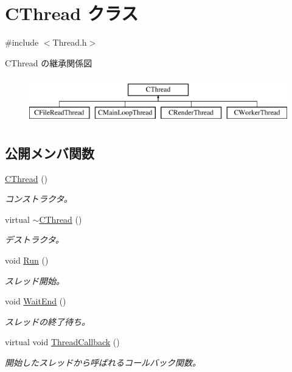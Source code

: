 \hypertarget{class_c_thread}{}\section{C\+Thread クラス}
\label{class_c_thread}


{\ttfamily \#include $<$Thread.\+h$>$}

C\+Thread の継承関係図\begin{figure}[H]
\begin{center}
\leavevmode
\includegraphics[height=2.000000cm]{class_c_thread}
\end{center}
\end{figure}
\subsection*{公開メンバ関数}
\begin{DoxyCompactItemize}
\item 
\hyperlink{class_c_thread_ad256868eded3b90abee1b5f656bb678e}{C\+Thread} ()
\begin{DoxyCompactList}\small\item\em コンストラクタ。 \end{DoxyCompactList}\item 
virtual \hyperlink{class_c_thread_a85a583b2edf56a6448e71e3a9ad301d2}{$\sim$\+C\+Thread} ()
\begin{DoxyCompactList}\small\item\em デストラクタ。 \end{DoxyCompactList}\item 
void \hyperlink{class_c_thread_afa189114d2d65ea7e39679d1ecc6466d}{Run} ()
\begin{DoxyCompactList}\small\item\em スレッド開始。 \end{DoxyCompactList}\item 
void \hyperlink{class_c_thread_a149db91da8c8672ef841a9136c8fae43}{Wait\+End} ()
\begin{DoxyCompactList}\small\item\em スレッドの終了待ち。 \end{DoxyCompactList}\item 
virtual void \hyperlink{class_c_thread_a15c60ba6d652d92c150fda5e10ebb23e}{Thread\+Callback} ()
\begin{DoxyCompactList}\small\item\em 開始したスレッドから呼ばれるコールバック関数。 \end{DoxyCompactList}\end{DoxyCompactItemize}
